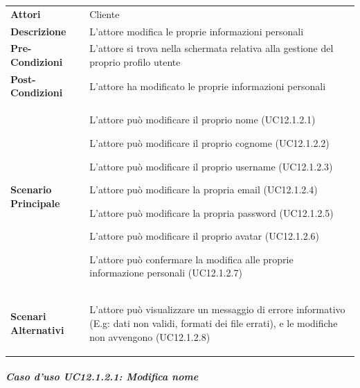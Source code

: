 \begin{tabular}{ l | p{11cm}}
	\hline
	\rowcolor{Gray}
	\multicolumn{2}{c}{UC12.1.2 - Modifica informazioni personali} \\
	\hline
	\textbf{Attori} & Cliente \\
	\textbf{Descrizione} & L'attore modifica le proprie informazioni personali \\
	\textbf{Pre-Condizioni} & L'attore si trova nella schermata relativa alla gestione del proprio profilo utente \\
	\textbf{Post-Condizioni} & L'attore ha modificato le proprie informazioni personali \\
	\textbf{Scenario Principale} & 
	\begin{enumerate*}[label=(\arabic*.),itemjoin={\newline}]
		\item L'attore può modificare il proprio nome (UC12.1.2.1)
		\item L'attore può modificare il proprio cognome (UC12.1.2.2)
		\item L'attore può modificare il proprio username (UC12.1.2.3)
		\item L'attore può modificare la propria email (UC12.1.2.4)
		\item L'attore può modificare la propria password (UC12.1.2.5)
		\item L'attore può modificare il proprio avatar (UC12.1.2.6)
		\item L'attore può confermare la modifica alle proprie informazione personali (UC12.1.2.7)
	\end{enumerate*}\\
	\textbf{Scenari Alternativi} & 
	\begin{enumerate*}[label=(\arabic*.),itemjoin={\newline}]
		\item L'attore può visualizzare un messaggio di errore informativo (E.g: dati non validi, formati dei file errati), e le modifiche non avvengono (UC12.1.2.8)
	\end{enumerate*}\\
\end{tabular}

\subparagraph{Caso d'uso UC12.1.2.1: Modifica nome}
\label{UC12_1_2_1}

